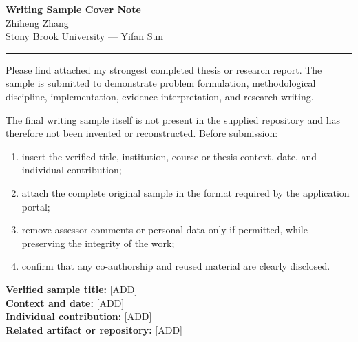 \documentclass[11pt]{article}
\newcommand{\ApplicantName}{Zhiheng Zhang}
\begin{document}
\begin{center}
{\LARGE\bfseries Writing Sample Cover Note}\\[0.25em]
{\large \ApplicantName}\\
Stony Brook University --- Yifan Sun
\end{center}
\vspace{0.35em}\hrule\vspace{0.65em}

Please find attached my strongest completed thesis or research report. The sample is submitted to demonstrate problem formulation, methodological discipline, implementation, evidence interpretation, and research writing.

The final writing sample itself is not present in the supplied repository and has therefore not been invented or reconstructed. Before submission:
\begin{enumerate}
\item insert the verified title, institution, course or thesis context, date, and individual contribution;
\item attach the complete original sample in the format required by the application portal;
\item remove assessor comments or personal data only if permitted, while preserving the integrity of the work;
\item confirm that any co-authorship and reused material are clearly disclosed.
\end{enumerate}

\textbf{Verified sample title:} [ADD]\\
\textbf{Context and date:} [ADD]\\
\textbf{Individual contribution:} [ADD]\\
\textbf{Related artifact or repository:} [ADD]
\end{document}
